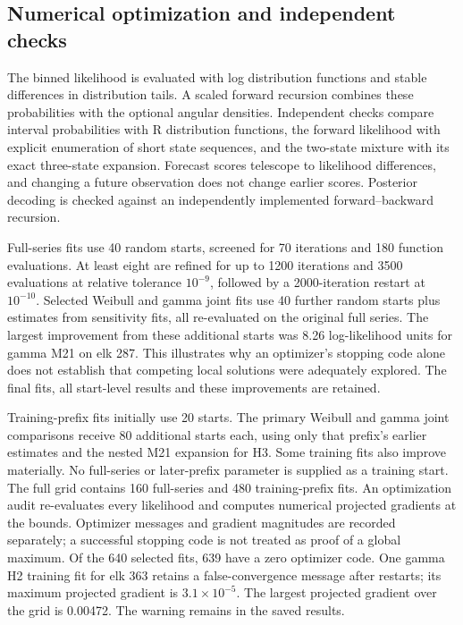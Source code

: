 \documentclass[11pt]{article}
\begin{document}
\subsection{Numerical optimization and independent checks}

The binned likelihood is evaluated with log distribution functions and
stable differences in distribution tails. A scaled forward recursion
combines these probabilities with the optional angular densities.
Independent checks compare interval probabilities with R distribution
functions, the forward likelihood with explicit enumeration of short
state sequences, and the two-state mixture with its exact three-state
expansion. Forecast scores telescope to likelihood differences, and changing
a future observation does not change earlier scores. Posterior decoding is
checked against an independently implemented forward--backward recursion.

Full-series fits use 40 random starts, screened for 70 iterations and
180 function evaluations. At least eight are refined for up to 1200
iterations and 3500 evaluations at relative tolerance $10^{-9}$, followed
by a 2000-iteration restart at $10^{-10}$. Selected Weibull and gamma
joint fits use 40 further random starts plus estimates from sensitivity
fits, all re-evaluated on the original full series. The largest improvement
from these additional starts was 8.26 log-likelihood units for gamma M21
on elk 287. This illustrates why an optimizer's stopping code alone does
not establish that competing local solutions were adequately explored.
The final fits, all start-level results and these improvements are retained.

Training-prefix fits initially use 20 starts. The primary Weibull and gamma
joint comparisons receive 80 additional starts each, using only that
prefix's earlier estimates and the nested M21 expansion for H3. Some
training fits also improve materially. No full-series or later-prefix
parameter is supplied as a training start. The full grid contains 160
full-series and 480 training-prefix fits. An optimization audit re-evaluates
every likelihood and computes numerical projected gradients at the bounds.
Optimizer messages and gradient magnitudes are recorded separately;
a successful stopping code is not treated as proof of a global maximum.
Of the 640 selected fits, 639 have a zero optimizer code. One gamma H2
training fit for elk 363 retains a false-convergence message after restarts;
its maximum projected gradient is $3.1\times10^{-5}$. The largest projected
gradient over the grid is 0.00472. The warning remains in the saved results.
\end{document}
